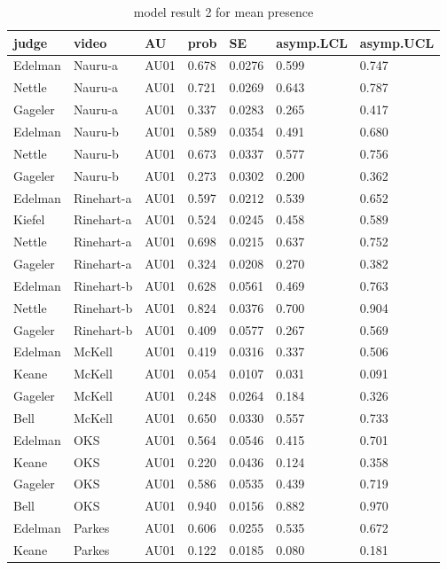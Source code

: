 \documentclass{monashthesis}
\begin{document}
\begin{center}
\begin{longtable}{lllllll}
\caption{\label{tab:result-2}model result 2 for mean presence}\\
\toprule
judge & video & AU & prob & SE & asymp.LCL & asymp.UCL \\
\midrule
\endhead
\bottomrule
\endfoot
Edelman & Nauru-a & AU01 & 0.678 & 0.0276 & 0.599 & 0.747 \\
Nettle & Nauru-a & AU01 & 0.721 & 0.0269 & 0.643 & 0.787 \\
Gageler & Nauru-a & AU01 & 0.337 & 0.0283 & 0.265 & 0.417 \\
Edelman & Nauru-b & AU01 & 0.589 & 0.0354 & 0.491 & 0.680 \\
Nettle & Nauru-b & AU01 & 0.673 & 0.0337 & 0.577 & 0.756 \\
Gageler & Nauru-b & AU01 & 0.273 & 0.0302 & 0.200 & 0.362 \\
Edelman & Rinehart-a & AU01 & 0.597 & 0.0212 & 0.539 & 0.652 \\
Kiefel & Rinehart-a & AU01 & 0.524 & 0.0245 & 0.458 & 0.589 \\
Nettle & Rinehart-a & AU01 & 0.698 & 0.0215 & 0.637 & 0.752 \\
Gageler & Rinehart-a & AU01 & 0.324 & 0.0208 & 0.270 & 0.382 \\
Edelman & Rinehart-b & AU01 & 0.628 & 0.0561 & 0.469 & 0.763 \\
Nettle & Rinehart-b & AU01 & 0.824 & 0.0376 & 0.700 & 0.904 \\
Gageler & Rinehart-b & AU01 & 0.409 & 0.0577 & 0.267 & 0.569 \\
Edelman & McKell & AU01 & 0.419 & 0.0316 & 0.337 & 0.506 \\
Keane & McKell & AU01 & 0.054 & 0.0107 & 0.031 & 0.091 \\
Gageler & McKell & AU01 & 0.248 & 0.0264 & 0.184 & 0.326 \\
Bell & McKell & AU01 & 0.650 & 0.0330 & 0.557 & 0.733 \\
Edelman & OKS & AU01 & 0.564 & 0.0546 & 0.415 & 0.701 \\
Keane & OKS & AU01 & 0.220 & 0.0436 & 0.124 & 0.358 \\
Gageler & OKS & AU01 & 0.586 & 0.0535 & 0.439 & 0.719 \\
Bell & OKS & AU01 & 0.940 & 0.0156 & 0.882 & 0.970 \\
Edelman & Parkes & AU01 & 0.606 & 0.0255 & 0.535 & 0.672 \\
Keane & Parkes & AU01 & 0.122 & 0.0185 & 0.080 & 0.181 \\

\end{longtable}
\end{center}
\end{document}

